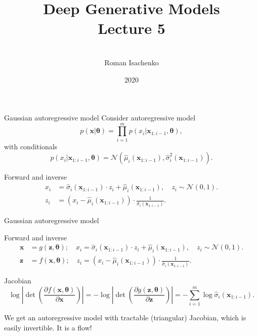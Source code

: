 \documentclass{beamer}
\title[\hbox to 56mm{Deep Generative Models  \hfill\insertframenumber\,/\,\inserttotalframenumber}]
{Deep Generative Models \\ Lecture 5}
\author[Roman Isachenko]{\\Roman Isachenko}
\institute[MIPT]{Moscow Institute of Physics and Technology \\
}
\date{2020}
\newcommand{\bx}{\mathbf{x}}
\newcommand{\bz}{\mathbf{z}}
\newcommand{\btheta}{\boldsymbol{\theta}}
\begin{document}
\begin{frame}
\titlepage
\end{frame}
\begin{frame}{Gaussian autoregressive model}
	Consider autoregressive model
	\[
		p(\bx | \btheta) = \prod_{i=1}^m p(x_i | \bx_{1:i - 1}, \btheta),
	\]
	with conditionals
	\[
		p(x_i | \bx_{1:i - 1}, \btheta) = \mathcal{N} \left(\hat{\mu}_i(\bx_{1:i-1}), \hat{\sigma}^2_i (\bx_{1:i-1})\right).
	\]
	\vspace{-0.5cm}
	\begin{block}{Forward and inverse}
		\vspace{-0.3cm}
		\begin{align*}
			x_i &= \hat{\sigma}_i (\bx_{1:i-1}) \cdot z_i + \hat{\mu}_i(\bx_{1:i-1}), \quad z_i \sim \mathcal{N}(0, 1). \\
			z_i &= \left(x_i - \hat{\mu}_i(\bx_{1:i-1}) \right) \cdot \frac{1}{\hat{\sigma}_i (\bx_{1:i-1}) }.
		\end{align*}
	\end{block}
\end{frame}
\begin{frame}{Gaussian autoregressive model}
	\begin{block}{Forward and inverse}
		\vspace{-0.3cm}
		\begin{align*}
			\bx &= g(\bz, \btheta); \quad x_i = \hat{\sigma}_i (\bx_{1:i-1}) \cdot z_i + \hat{\mu}_i(\bx_{1:i-1}), \quad z_i \sim \mathcal{N}(0, 1). \\
			\bz &= f(\bx, \btheta); \quad z_i = \left(x_i - \hat{\mu}_i(\bx_{1:i-1}) \right) \cdot \frac{1}{\hat{\sigma}_i (\bx_{1:i-1}) }.
		\end{align*}
	\vspace{-0.3cm}
	\end{block}
	\begin{block}{Jacobian}
		\vspace{-0.3cm}
		\[
		\log \left|\det \left( \frac{\partial f(\bx, \btheta)}{\partial \bx} \right) \right| = -\log \left|\det \left( \frac{\partial g(\bz, \btheta)}{\partial \bz} \right) \right| = - \sum_{i = 1}^m \log \hat{\sigma}_i (\bx_{1:i-1}).
		\]
		\vspace{-0.3cm}
	\end{block} 
	We get an autoregressive model with tractable (triangular) Jacobian, which is easily invertible. It is a flow!
\end{frame}
\end{document}
